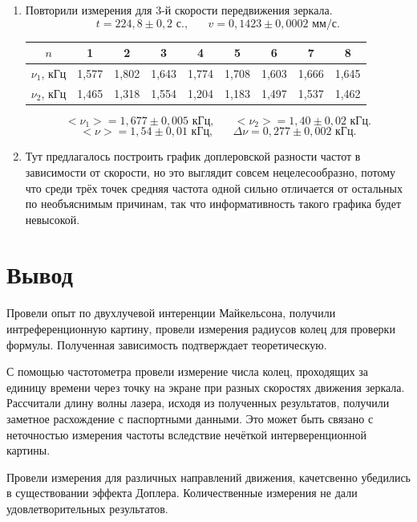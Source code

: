\documentclass[a4paper,12pt]{article}
\begin{document}
\begin{enumerate}
	
	\item Повторили измерения для 3-й скорости передвижения зеркала.
		\begin{equation*}
	t = 224{,}8\pm0{,}2 \text{ с.}, \;\;\;\;\;\; v = 0{,}1423\pm0{,}0002\text{ мм/с}.
	\end{equation*}
	\begin{center}
		\begin{tabular}{|c|c|c|c|c|c|c|c|c|}
			\hline
			$n$ & 1 & 2 & 3 & 4 & 5 & 6 & 7 & 8 \\ \hline
			$\nu_1$, кГц & 1,577 & 1,802 & 1,643 & 1,774 & 1,708 & 1,603 & 1,666 & 1,645 \\ \hline
			$\nu_2$, кГц & 1,465 & 1,318 & 1,554 & 1,204 & 1,183 & 1,497 & 1,537 & 1,462 \\ \hline
		\end{tabular}
	\end{center}
	\begin{equation*}
	<\nu_1> = 1{,}677\pm0{,}005\text{ кГц},\;\;\;\;\;\; <\nu_2>=1{,}40\pm0{,}02\text{ кГц}.
	\end{equation*} 
	\begin{equation*}
	<\nu> = 1{,}54\pm0{,}01\text{ кГц},\;\;\;\;\;\; \Delta\nu=0{,}277\pm0{,}002\text{ кГц}.
	\end{equation*}
	\item Тут предлагалось построить график доплеровской разности частот в зависимости от скорости, но это выглядит совсем нецелесообразно, потому что среди трёх точек средняя частота одной сильно отличается от остальных по необъяснимым причинам, так что информативность такого графика будет невысокой.
\end{enumerate}
\section*{Вывод}
Провели опыт по двухлучевой интеренции Майкельсона, получили интреференционную картину, провели измерения радиусов колец для проверки формулы. Полученная зависимость подтверждает теоретическую. 

С помощью частотометра провели измерение числа колец, проходящих за единицу времени через точку на экране при разных скоростях движения зеркала. Рассчитали длину волны лазера, исходя из полученных результатов, получили заметное расхождение с паспортными данными. Это может быть связано с неточностью измерения частоты вследствие нечёткой интерверенционной картины. 

Провели измерения для различных направлений движения, качетсвенно убедились в существовании эффекта Доплера. Количественные измерения не дали удовлетворительных результатов.  
\end{document}
